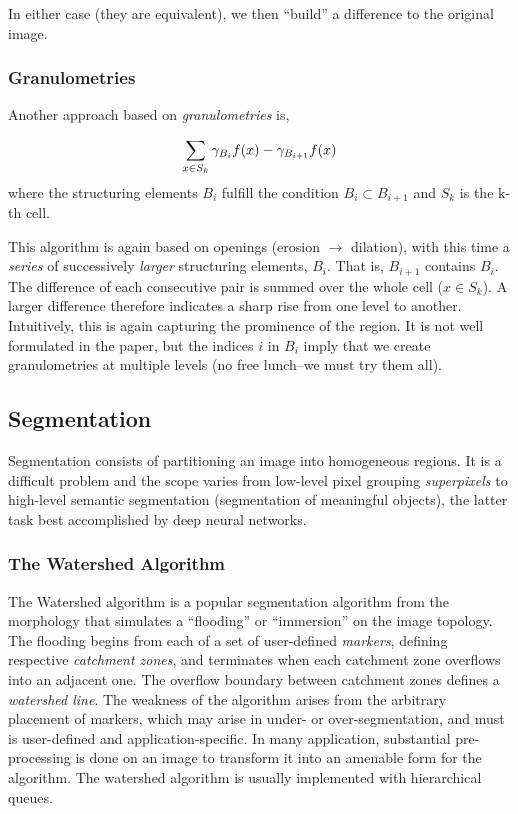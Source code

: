 \documentclass[11pt]{amsart}
\begin{document}
In either case (they are equivalent), we then ``build'' a difference to the original image.

\subsubsection{Granulometries}

Another approach based on \emph{granulometries} is,

\begin{equation}
\sum_{x \in S_k} \gamma_{B_i}f(x) - \gamma_{B_{i+1}}f(x) \notag
\end{equation}
where the structuring elements $B_i$ fulfill the condition $B_{i} \subset B_{i+1}$ and $S_k$ is the k-th cell.

This algorithm is again based on openings (erosion $\to$ dilation), with this time a \emph{series} of successively \emph{larger} structuring elements, $B_i$. That is, $B_{i+1}$ contains $B_i$. The difference of each consecutive pair is summed over the whole cell ($x \in S_k$). A larger difference therefore indicates a sharp rise from one level to another. Intuitively, this is again capturing the prominence of the region. It is not well formulated in the paper, but the indices $i$ in $B_i$ imply that we create granulometries at multiple levels (no free lunch--we must try them all).

\subsection{Segmentation}

Segmentation consists of partitioning an image into homogeneous regions. It is a difficult problem and the scope varies from low-level pixel grouping \emph{superpixels} to high-level semantic segmentation (segmentation of meaningful objects), the latter task best accomplished by deep neural networks.

\subsubsection{The Watershed Algorithm}

The Watershed algorithm is a popular segmentation algorithm from the morphology  that simulates a ``flooding'' or ``immersion'' on the image topology. The flooding begins from each of a set of user-defined \emph{markers}, defining respective \emph{catchment zones}, and terminates when each catchment zone overflows into an adjacent one. The overflow boundary between catchment zones defines a \emph{watershed line}. The weakness of the algorithm arises from the arbitrary placement of markers, which may arise in under- or over-segmentation, and must is user-defined and application-specific. In many application, substantial pre-processing is done on an image to transform it into an amenable form for the algorithm. The watershed algorithm is usually implemented with hierarchical queues. 
\end{document}

